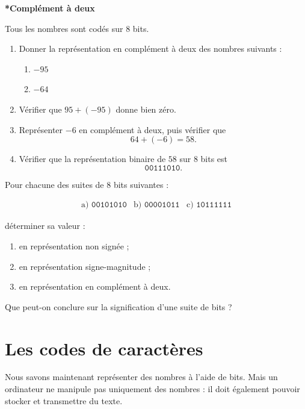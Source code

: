 \documentclass[11pt, a4paper]{book}
\begin{document}
\begin{exercice}
\textbf{*Complément à deux}

Tous les nombres sont codés sur 8 bits.

\begin{enumerate}
    \item Donner la représentation en complément à deux des nombres suivants :
    \begin{enumerate}
        \item $-95$
        \item $-64$
    \end{enumerate}

    \item Vérifier que $95+(-95)$ donne bien zéro.

    \item Représenter $-6$ en complément à deux, puis vérifier que
    \[
        64+(-6)=58.
    \]

    \item Vérifier que la représentation binaire de $58$ sur 8 bits est
    \[
        \texttt{00111010}.
    \]
\end{enumerate}
\end{exercice}

\begin{exercice}
Pour chacune des suites de 8 bits suivantes :

\[
\begin{array}{lll}
\text{a) }\texttt{00101010}
&
\text{b) }\texttt{00001011}
&
\text{c) }\texttt{10111111}
\end{array}
\]

déterminer sa valeur :

\begin{enumerate}
    \item en représentation non signée ;
    \item en représentation signe-magnitude ;
    \item en représentation en complément à deux.
\end{enumerate}

Que peut-on conclure sur la signification d'une suite de bits ?
\end{exercice}

\section{Les codes de caractères}

Nous savons maintenant représenter des nombres à l'aide de bits. Mais un ordinateur
ne manipule pas uniquement des nombres : il doit également pouvoir stocker et
transmettre du texte.
\end{document}
